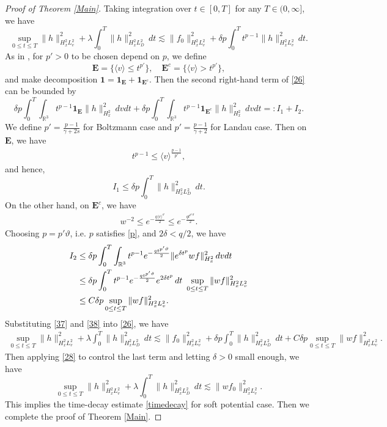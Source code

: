\documentclass[reqno,a4paper]{amsart}
\numberwithin{equation}{section}
\newcommand{\1}{\mathbf{1}}
\newcommand{\R}{\mathbb{R}}
\newcommand{\vt}{\vartheta}
\newcommand{\<}{\langle}
\renewcommand{\>}{\rangle}
\begin{document}
\begin{proof}[Proof of Theorem \ref{Main}]
Taking integration over $t\in[0,T]$ for any $T\in(0,\infty]$, we have 
\begin{equation}\label{26}
	\sup_{0\le t\le T}\|h\|^2_{H^2_xL^2_v} + \lambda\int^T_0\|h\|_{H^2_xL^2_D}^2\,dt \lesssim\|f_0\|^2_{H^2_xL^2_v}+ \delta p\int^T_0t^{p-1}\|h\|^2_{H^2_xL^2_v}\,dt. 
\end{equation}
As in \cite{Strain2012, Duan2020}, for $p'>0$ to be chosen depend on $p$, we define 
\begin{equation*}
	\mathbf{E} = \{\<v\>\le  t^{p'}\}, \quad 	\mathbf{E}^c = \{\<v\>>  t^{p'}\},
\end{equation*}
and make decomposition $\1=\1_{\mathbf{E}}+\1_{\mathbf{E}^c}$. Then the second right-hand term of \eqref{26} can be bounded by 
\begin{equation*}
	\delta p\int^T_0\int_{\R^3}t^{p-1}\1_{\mathbf{E}}\|h\|^2_{H^2_x}\,dvdt + \delta p\int^T_0\int_{\R^3}t^{p-1}\1_{\mathbf{E}^c}\|h\|^2_{H^2_x}\,dvdt =:I_1+I_2. 
\end{equation*}
We define $p' = \frac{p-1}{\gamma+2s}$ for Boltzmann case and $p'=\frac{p-1}{\gamma+2}$ for Landau case. Then on $\mathbf{E}$, we have 
\begin{align*}
	t^{p-1} \le \<v\>^{\frac{p-1}{p'}}, 
\end{align*}and hence, 
\begin{equation}\label{37}
	I_1 \le \delta p\int^T_0\|h\|^2_{H^2_xL^2_D}\,dt.
\end{equation}
On the other hand, on $\mathbf{E}^c$, we have 
\begin{align*}
	w^{-2} \le e^{-\frac{q\<v\>^\vt}{2}} \le e^{-\frac{q t^{p'\vt}}{2}}. 
\end{align*}
Choosing $p = p'\vt$, i.e. $p$ satisfies \eqref{p}, and $2\delta<q/2$, we have 
\begin{align}\label{38}\notag
	I_2 &\le \delta p\int^T_0\int_{\R^3}t^{p-1}e^{-\frac{q t^{p'\vt}}{2}}\|e^{\delta t^p}wf\|^2_{H^2_x}\,dvdt\\
	&\notag\le \delta p\int^T_0t^{p-1}e^{-\frac{q t^{p'\vt}}{2}}e^{2\delta t^p}\,dt\ \sup_{0\le t\le T}\|wf\|^2_{H^2_xL^2_v}\\
	&\le C\delta p\sup_{0\le t\le T}\|wf\|^2_{H^2_xL^2_v}. 
\end{align}
Substituting \eqref{37} and \eqref{38} into \eqref{26}, we have 
\begin{align*}
	\sup_{0\le t\le T}\|h\|^2_{H^2_xL^2_v} + \lambda\int^T_0\|h\|_{H^2_xL^2_D}^2\,dt \lesssim\|f_0\|^2_{H^2_xL^2_v}+ \delta p\int^T_0\|h\|^2_{H^2_xL^2_D}\,dt + C\delta p\sup_{0\le t\le T}\|wf\|^2_{H^2_xL^2_v}. 
\end{align*}
Then applying \eqref{28} to control the last term and letting $\delta>0$ small enough, we have 
\begin{equation*}
	\sup_{0\le t\le T}\|h\|^2_{H^2_xL^2_v} + \lambda\int^T_0\|h\|_{H^2_xL^2_D}^2\,dt\lesssim\|wf_0\|^2_{H^2_xL^2_v}. 
\end{equation*}
This implies the time-decay estimate \eqref{timedecay} for soft potential case. 
Then we complete the proof of Theorem \ref{Main}. 
\end{proof}
\end{document}
